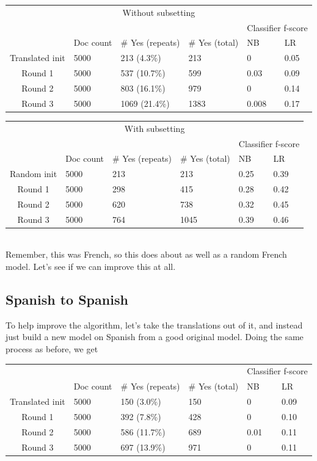 \documentclass[11pt]{article} %
\begin{document}
\begin{tabular}{|c|l|l|l|l|l|}
\multicolumn{6}{|c|}{Without subsetting} \\
\rowcolor{gray!50} &&&& \multicolumn{2}{|c|}{Classifier f-score} \\
\rowcolor{gray!50} & Doc count & \# Yes (repeats) & \# Yes (total) & NB & LR \\
Translated init & 5000 & 213 (4.3\%) & 213 & 0 & 0.05 \\
Round 1 & 5000 &  537 (10.7\%) & 599 & 0.03 & 0.09 \\
Round 2 & 5000 &  803 (16.1\%) & 979 & 0 & 0.14 \\
Round 3 & 5000 & 1069 (21.4\%) & 1383 & 0.008 & 0.17 \\
\end{tabular}
\quad
\begin{tabular}{|c|l|l|l|l|l|}
\multicolumn{6}{|c|}{With subsetting} \\
\rowcolor{gray!50} &&&& \multicolumn{2}{|c|}{Classifier f-score} \\
\rowcolor{gray!50} & Doc count & \# Yes (repeats) & \# Yes (total) & NB & LR \\
Random init & 5000 & 213 & 213 & 0.25 & 0.39 \\
Round 1 & 5000 & 298 & 415 & 0.28 & 0.42 \\
Round 2 & 5000 & 620 & 738 & 0.32 & 0.45 \\
Round 3 & 5000 & 764 & 1045 & 0.39 & 0.46 \\
\end{tabular} \\

Remember, this was French, so this does about as well as a random French model. Let's see if we can improve this at all.

\subsection{Spanish to Spanish}

To help improve the algorithm, let's take the translations out of it, and instead just build a new model on Spanish from a good original model. Doing the same process as before, we get \\

\begin{tabular}{|c|l|l|l|l|l|}
\rowcolor{gray!50} &&&& \multicolumn{2}{|c|}{Classifier f-score} \\
\rowcolor{gray!50} & Doc count & \# Yes (repeats) & \# Yes (total) & NB & LR \\
Translated init & 5000 & 150 (3.0\%) & 150 & 0 & 0.09 \\
Round 1 & 5000 &  392 (7.8\%) & 428 & 0 & 0.10 \\
Round 2 & 5000 & 586 (11.7\%)& 689 & 0.01 & 0.11 \\
Round 3 & 5000 & 697 (13.9\%) & 971 & 0 & 0.11
\end{tabular} \\
\end{document}
